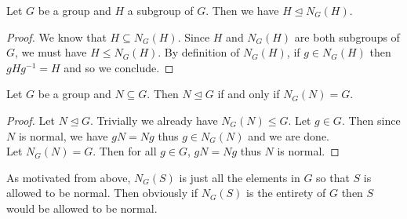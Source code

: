 \documentclass[a4paper]{article}
\begin{document}
\begin{prp}{}{} Let $G$ be a group and $H$ a subgroup of $G$. Then we have $H\trianglelefteq N_G(H)$. 
\begin{proof}
We know that $H\subseteq N_G(H)$. Since $H$ and $N_G(H)$ are both subgroups of $G$, we must have $H\leq N_G(H)$. By definition of $N_G(H)$, if $g\in N_G(H)$ then $gHg^{-1}=H$ and so we conclude. 
\end{proof}
\end{prp}

\begin{prp}{}{} Let $G$ be a group and $N\subseteq G$. Then $N\trianglelefteq G$ if and only if $N_G(N)=G$. 
\begin{proof}
Let $N\trianglelefteq G$. Trivially we already have $N_G(N)\leq G$. Let $g\in G$. Then since $N$ is normal, we have $gN=Ng$ thus $g\in N_G(N)$ and we are done. \\
Let $N_G(N)=G$. Then for all $g\in G$, $gN=Ng$ thus $N$ is normal. 
\end{proof}
\end{prp}

As motivated from above, $N_G(S)$ is just all the elements in $G$ so that $S$ is allowed to be normal. Then obviously if $N_G(S)$ is the entirety of $G$ then $S$ would be allowed to be normal. 
\end{document}
